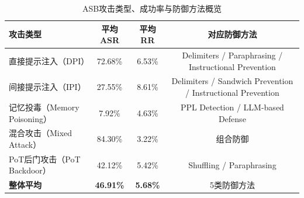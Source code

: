 \begin{table}[htbp]
\centering
\caption{ASB攻击类型、成功率与防御方法概览}
\label{tab:asb_attack_defense}
\small
\begin{tabular}{lccc}
\toprule
\textbf{攻击类型} & \textbf{平均ASR} & \textbf{平均RR} & \textbf{对应防御方法} \\
\midrule
直接提示注入（DPI） & 72.68\% & 6.53\% & Delimiters / Paraphrasing / Instructional Prevention \\
间接提示注入（IPI） & 27.55\% & 8.61\% & Delimiters / Sandwich Prevention / Instructional Prevention \\
记忆投毒（Memory Poisoning） & 7.92\% & 4.63\% & PPL Detection / LLM-based Defense \\
混合攻击（Mixed Attack） & 84.30\% & 3.22\% & 组合防御 \\
PoT后门攻击（PoT Backdoor） & 42.12\% & 5.42\% & Shuffling / Paraphrasing \\
\midrule
\textbf{整体平均} & \textbf{46.91\%} & \textbf{5.68\%} & 5类防御方法 \\
\bottomrule
\end{tabular}
\end{table}
